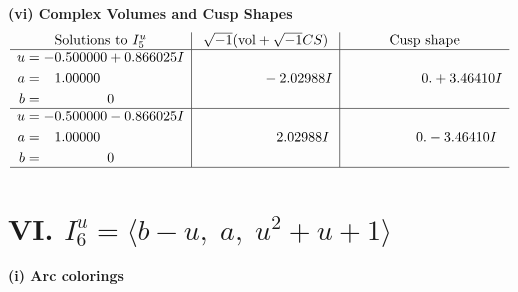 \documentclass[1p]{elsarticle_modified}
\theoremstyle{definition}
\newcommand{\I}{\sqrt{-1}}
\begin{document}
\newpage\flushleft \textbf{(vi) Complex Volumes and Cusp Shapes}
$$\begin{array}{c|c|c}  
\text{Solutions to }I^u_{5}& \I (\text{vol} + \sqrt{-1}CS) & \text{Cusp shape}\\
 \hline 
\begin{aligned}
u &= -0.500000 + 0.866025 I \\
a &= \phantom{-}1.00000\phantom{ +0.000000I} \\
b &= \phantom{-0.000000 } 0\end{aligned}
 & \phantom{-0.000000 } -2.02988 I & \phantom{-0.000000 -}0. + 3.46410 I \\ \hline\begin{aligned}
u &= -0.500000 - 0.866025 I \\
a &= \phantom{-}1.00000\phantom{ +0.000000I} \\
b &= \phantom{-0.000000 } 0\end{aligned}
 & \phantom{-0.000000 -}2.02988 I & \phantom{-0.000000 } 0. - 3.46410 I\\
 \hline 
 \end{array}$$\newpage\newpage\renewcommand{\arraystretch}{1}
\centering \section*{VI. $I^u_{6}= \langle b- u,\;a,\;u^2+u+1 \rangle$}
\flushleft \textbf{(i) Arc colorings}\\
\end{document}
